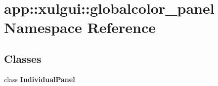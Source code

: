 \section{app::xulgui::globalcolor\_\-panel Namespace Reference}
\label{namespaceapp_1_1xulgui_1_1globalcolor__panel}


\subsection*{Classes}
\begin{CompactItemize}
\item 
class {\bf IndividualPanel}
\end{CompactItemize}
